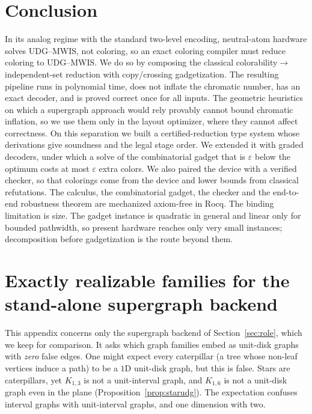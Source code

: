 \documentclass[a4paper,fleqn]{cas-sc}
\begin{document}
\section{Conclusion}
\label{sec:conclusion}

In its analog regime with the standard two-level encoding, neutral-atom hardware
solves UDG--MWIS, not coloring, so an exact coloring compiler must reduce coloring to
UDG--MWIS. We do so by composing the classical colorability$\to$independent-set
reduction with copy/crossing gadgetization. The resulting pipeline runs in polynomial
time, does not inflate the chromatic number, has an exact decoder, and is proved
correct once for all inputs. The geometric heuristics on which a supergraph approach
would rely provably cannot bound chromatic inflation, so we use them only in the
layout optimizer, where they cannot affect correctness. On this separation we built a
certified-reduction type system whose derivations give soundness and the legal stage
order. We extended it with graded decoders, under which a solve of the combinatorial
gadget that is $\varepsilon$ below the optimum costs at most $\varepsilon$ extra
colors. We also paired the device with a verified checker, so that colorings come from
the device and lower bounds from classical refutations. The calculus, the
combinatorial gadget, the checker and the end-to-end robustness theorem are
mechanized axiom-free in Rocq. The binding limitation is size. The gadget instance is
quadratic in general and linear only for bounded pathwidth, so present hardware
reaches only very small instances; decomposition before gadgetization is the route
beyond them.

\appendix
\section{Exactly realizable families for the stand-alone supergraph backend}
\label{app:families}

This appendix concerns only the supergraph backend of Section~\ref{sec:role}, which we
keep for comparison. It asks which graph families embed as unit-disk graphs with
\emph{zero} false edges. One might expect every caterpillar (a tree whose non-leaf
vertices induce a path) to be a $1$D unit-disk graph, but this is false. Stars are
caterpillars, yet $K_{1,3}$ is not a unit-interval graph, and $K_{1,6}$ is not a
unit-disk graph even in the plane (Proposition~\ref{prop:starudg}). The expectation
confuses interval graphs with unit-interval graphs, and one dimension with two.
\end{document}
